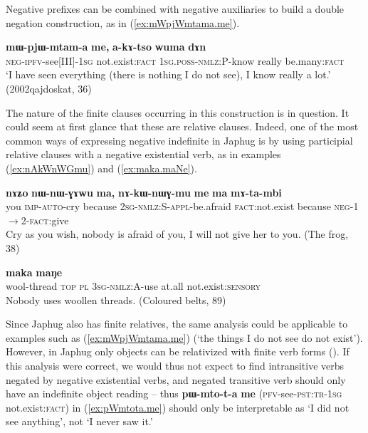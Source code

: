 \documentclass[oneside,a4paper,11pt]{article}
\newcommand{\ipa}[1]{\textbf{\phon#1}} %
\newcommand{\refb}[1]{(\ref{#1})}
\begin{document}
Negative prefixes can be combined with negative auxiliaries to build a double negation construction, as in \refb{ex:mWpjWmtama.me}. 
 \begin{exe}
\ex \label{ex:mWpjWmtama.me}
\gll 
  \ipa{mɯ-pjɯ-mtam-a} 	\ipa{me,} 	\ipa{a-kɤ-tso} 	\ipa{wuma} 	\ipa{dɤn} \\
  \textsc{neg-ipfv}-see[III]-\textsc{1sg} not.exist:\textsc{fact} \textsc{1sg.poss-nmlz}:P-know really be.many:\textsc{fact} \\
\glt `I have seen everything (there is nothing I do not see), I know really a lot.' (2002qajdoskat, 36)
\end{exe} 

The nature of the finite clauses occurring in this construction is in question. It could seem at first glance that these are relative clauses. Indeed, one of the most common ways of expressing negative indefinite in Japhug is by using participial relative clauses with a negative existential verb, as in examples \refb{ex:nAkWnWGmu} and \refb{ex:maka.maNe}.

\begin{exe}
   \ex  \label{ex:nAkWnWGmu}
\gll   
\ipa{nɤʑo}  	\ipa{nɯ-nɯ-ɣɤwu}  	\ipa{ma,}  	\ipa{nɤ-kɯ-nɯɣ-mu}  	\ipa{me}  	\ipa{ma}  	\ipa{mɤ-ta-mbi}  \\
you \textsc{imp-auto}-cry because \textsc{2sg-nmlz:S-appl}-be.afraid \textsc{fact}:not.exist because \textsc{neg-1$\rightarrow$2-fact}:give \\
\glt Cry as you wish, nobody is afraid of you, I will not give her to you.  (The frog, 38)
\end{exe}

\begin{exe}
   \ex  \label{ex:maka.maNe}
\gll   
[\ipa{smɤɣ-ri}  	\ipa{nɯ}  	\ipa{ra}  	\ipa{ɯ-kɯ-ntɕhoz}]  	\ipa{maka}  	\ipa{maŋe}   \\
wool-thread \textsc{top} \textsc{pl} \textsc{3sg-nmlz:A}-use at.all not.exist:\textsc{sensory}  \\
\glt Nobody uses woollen threads. (Coloured belts, 89)
\end{exe}

Since Japhug also has finite relatives, the same analysis could be applicable to examples such as \refb{ex:mWpjWmtama.me} (`the things I do not see do not exist').  However, in Japhug only objects can be relativized with finite verb forms (\citealt[12-3]{jacques16relatives}). If this analysis were correct, we would thus not expect to find intransitive verbs negated  by negative existential verbs, and negated transitive verb should only have an indefinite object reading -- thus \ipa{pɯ-mto-t-a}  \ipa{me} (\textsc{pfv}-see-\textsc{pst:tr-1sg} not.exist:\textsc{fact})
in \refb{ex:pWmtota.me} should only be interpretable as `I did not see anything', not `I never saw it.'
\end{document}
